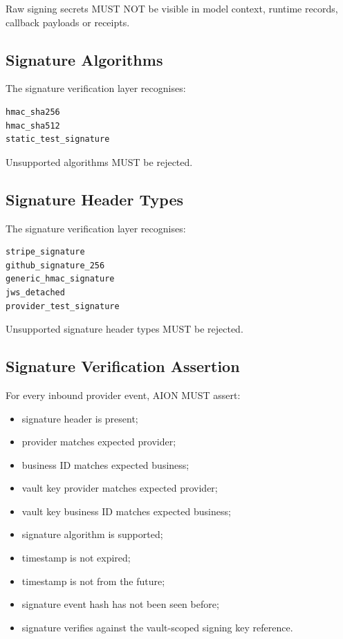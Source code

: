 Raw signing secrets MUST NOT be visible in model context, runtime records, callback payloads or receipts.

\subsection{Signature Algorithms}

The signature verification layer recognises:

\begin{verbatim}
hmac_sha256
hmac_sha512
static_test_signature
\end{verbatim}

Unsupported algorithms MUST be rejected.

\subsection{Signature Header Types}

The signature verification layer recognises:

\begin{verbatim}
stripe_signature
github_signature_256
generic_hmac_signature
jws_detached
provider_test_signature
\end{verbatim}

Unsupported signature header types MUST be rejected.

\subsection{Signature Verification Assertion}

For every inbound provider event, AION MUST assert:

\begin{itemize}
  \item signature header is present;
  \item provider matches expected provider;
  \item business ID matches expected business;
  \item vault key provider matches expected provider;
  \item vault key business ID matches expected business;
  \item signature algorithm is supported;
  \item timestamp is not expired;
  \item timestamp is not from the future;
  \item signature event hash has not been seen before;
  \item signature verifies against the vault-scoped signing key reference.
\end{itemize}


